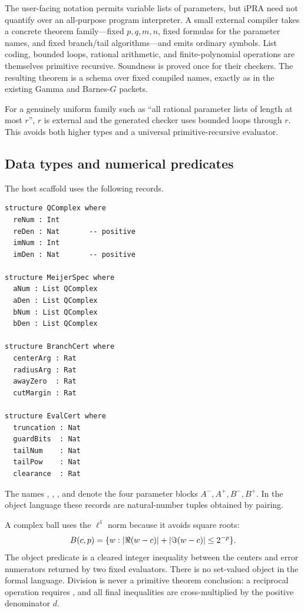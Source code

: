 The user-facing notation permits variable lists of parameters, but iPRA need
not quantify over an all-purpose program interpreter.  A small external
compiler takes a concrete theorem family---fixed $p,q,m,n$, fixed formulas for
the parameter names, and fixed branch/tail algorithms---and emits ordinary
 symbols.  List coding, bounded loops, rational arithmetic, and
finite-polynomial operations are themselves primitive recursive.  Soundness
is proved once for their checkers.  The resulting theorem is a schema over
fixed compiled names, exactly as in the existing Gamma and Barnes-$G$ packets.

For a genuinely uniform family such as ``all rational parameter lists of
length at most $r$'', $r$ is external and the generated checker uses bounded
loops through $r$.  This avoids both higher types and a universal
primitive-recursive evaluator.

\subsection{Data types and numerical predicates}

The host scaffold uses the following records.
\begin{lstlisting}[language={}]
structure QComplex where
  reNum : Int
  reDen : Nat       -- positive
  imNum : Int
  imDen : Nat       -- positive

structure MeijerSpec where
  aNum : List QComplex
  aDen : List QComplex
  bNum : List QComplex
  bDen : List QComplex

structure BranchCert where
  centerArg : Rat
  radiusArg : Rat
  awayZero  : Rat
  cutMargin : Rat

structure EvalCert where
  truncation : Nat
  guardBits  : Nat
  tailNum    : Nat
  tailPow    : Nat
  clearance  : Rat
\end{lstlisting}
The names , , , and  denote the
four parameter blocks $A^-,A^+,B^-,B^+$.  In the object language these records
are natural-number tuples obtained by pairing.

A complex ball uses the $\ell^1$ norm because it avoids square roots:
\[
 B(c,p)=\{w:\left|\Re(w-c)\right|+\left|\Im(w-c)\right|\le2^{-p}\}.
\]
The object predicate  is a cleared integer inequality
between the centers and error numerators returned by two fixed evaluators.
There is no set-valued object in the formal language.  Division is never a
primitive theorem conclusion: a reciprocal operation requires
, and all final inequalities are cross-multiplied by the
positive denominator $d$.

